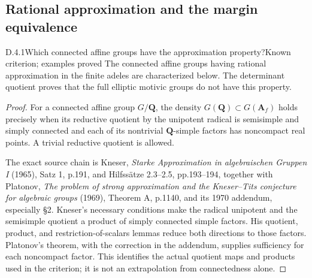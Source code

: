 \subsection{Rational approximation and the margin equivalence}

\begin{result}{D.4.1}{Which connected affine groups have the approximation property?}{Known criterion; examples proved}
The connected affine groups having rational approximation in the finite adeles are characterized below. The determinant quotient proves that the full elliptic motivic groups do not have this property.
\end{result}
\begin{proof}
For a connected affine group \(G/\mathbf Q\), the density
\(G(\mathbf Q)\subset G(\mathbf A_f)\) holds precisely when its
reductive quotient by the unipotent radical is semisimple and simply
connected and each of its nontrivial \(\mathbf Q\)-simple factors has
noncompact real points. A trivial reductive quotient is allowed.

The exact source chain is Kneser, \emph{Starke Approximation in algebraischen
Gruppen I} (1965), Satz 1, p.191, and Hilfssätze 2.3--2.5, pp.193--194,
together with Platonov, \emph{The problem of strong approximation and the
Kneser--Tits conjecture for algebraic groups} (1969), Theorem A, p.1140,
and its 1970 addendum, especially §2. Kneser's necessary conditions
make the radical unipotent and the semisimple quotient a product of
simply connected simple factors. His quotient, product, and
restriction-of-scalars lemmas reduce both directions to those
factors. Platonov's theorem, with the correction in the addendum,
supplies sufficiency for each noncompact factor. This identifies the
actual quotient maps and products used in the criterion; it is not
an extrapolation from connectedness alone.


\end{proof}
